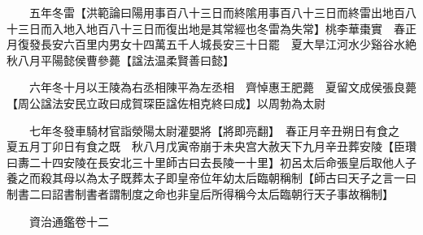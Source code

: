 　　五年冬雷【洪範論曰陽用事百八十三日而終隂用事百八十三日而終雷出地百八十三日而入地入地百八十三日而復出地是其常經也冬雷為失常】桃李華棗實　春正月復發長安六百里内男女十四萬五千人城長安三十日罷　夏大旱江河水少谿谷水絶　秋八月平陽懿侯曹參薨【諡法温柔賢善曰懿】

　　六年冬十月以王陵為右丞相陳平為左丞相　齊悼惠王肥薨　夏留文成侯張良薨【周公諡法安民立政曰成賀琛臣諡佐相克終曰成】以周勃為太尉

　　七年冬發車騎材官詣滎陽太尉灌嬰將【將即亮翻】　春正月辛丑朔日有食之　夏五月丁卯日有食之既　秋八月戊寅帝崩于未央宫大赦天下九月辛丑葬安陵【臣瓚曰夀二十四安陵在長安北三十里師古曰去長陵一十里】初呂太后命張皇后取他人子養之而殺其母以為太子既葬太子即皇帝位年幼太后臨朝稱制【師古曰天子之言一曰制書二曰詔書制書者謂制度之命也非皇后所得稱今太后臨朝行天子事故稱制】

　　資治通鑑卷十二  
    


 


 



 

 
  







 


　　
　　
　
　
　


　　

　















	
	










































